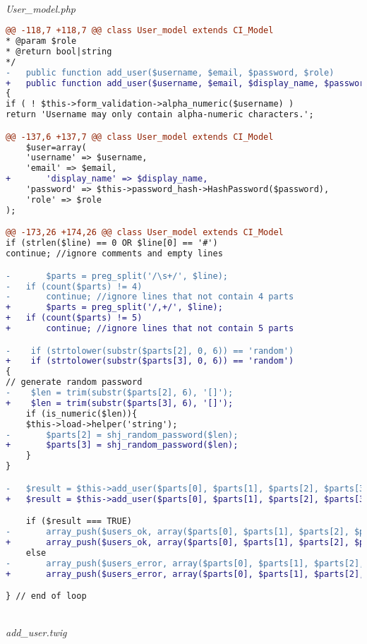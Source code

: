 ~\\
\textit{User\_model.php}
\begin{lstlisting}[language=diff, basicstyle=\ttfamily, frame=single,
columns=fullflexible, keepspaces=true, breaklines=true]
@@ -118,7 +118,7 @@ class User_model extends CI_Model
* @param $role
* @return bool|string
*/
-   public function add_user($username, $email, $password, $role)
+   public function add_user($username, $email, $display_name, $password, $role)
{
if ( ! $this->form_validation->alpha_numeric($username) )
return 'Username may only contain alpha-numeric characters.';

@@ -137,6 +137,7 @@ class User_model extends CI_Model
	$user=array(
	'username' => $username,
	'email' => $email,
+   	'display_name' => $display_name,
	'password' => $this->password_hash->HashPassword($password),
	'role' => $role
);

@@ -173,26 +174,26 @@ class User_model extends CI_Model
if (strlen($line) == 0 OR $line[0] == '#')
continue; //ignore comments and empty lines

-       $parts = preg_split('/\s+/', $line);
-   if (count($parts) != 4)
-   	continue; //ignore lines that not contain 4 parts
+       $parts = preg_split('/,+/', $line);
+   if (count($parts) != 5)
+       continue; //ignore lines that not contain 5 parts

-    if (strtolower(substr($parts[2], 0, 6)) == 'random')
+    if (strtolower(substr($parts[3], 0, 6)) == 'random')
{
// generate random password
-    $len = trim(substr($parts[2], 6), '[]');
+    $len = trim(substr($parts[3], 6), '[]');
	if (is_numeric($len)){
	$this->load->helper('string');
-   	$parts[2] = shj_random_password($len);
+       $parts[3] = shj_random_password($len);
	}
}

-   $result = $this->add_user($parts[0], $parts[1], $parts[2], $parts[3]);
+   $result = $this->add_user($parts[0], $parts[1], $parts[2], $parts[3], $parts[4]);

	if ($result === TRUE)
-   	array_push($users_ok, array($parts[0], $parts[1], $parts[2], $parts[3]));
+       array_push($users_ok, array($parts[0], $parts[1], $parts[2], $parts[3], $parts[4]));
	else
-       array_push($users_error, array($parts[0], $parts[1], $parts[2], $parts[3], $result));
+       array_push($users_error, array($parts[0], $parts[1], $parts[2], $parts[3], $parts[4], $result));

} // end of loop
\end{lstlisting}
~\\
\textit{add\_user.twig}
